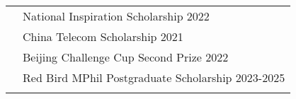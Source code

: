 \documentclass[letterpaper, 11pt]{article}
\begin{document}
\begin{longtable}{p{1.3in}p{4.8in}}

 





{\color{RoyalBlue}{Selected Honors }} 
&  National Inspiration Scholarship  \hfill 2022\\
{\color{RoyalBlue}{and Scholarships}} 
& China Telecom Scholarship \hfill 2021 \\
& Beijing Challenge Cup Second Prize \hfill 2022 \\
& Red Bird MPhil Postgraduate Scholarship \hfill 2023-2025 \\
& \\


\end{longtable}
\end{document}
